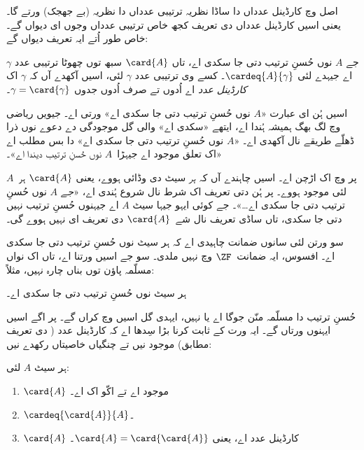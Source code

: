 \documentclass[../../../include/open-logic-section]{subfiles}
\begin{document}

اصل وچ کارڈینل عدداں دا ساڈا نظریہ ترتیبی عدداں دا نظریہ (بے جھجک) ورتے گا۔ یعنی اسیں کارڈینل عدداں دی تعریف کجھ خاص ترتیبی عدداں وجوں ای دیواں گے۔ خاص طور اُتے ایہ تعریف دیواں گے:

\begin{defn}
جے $A$ نوں حُسنِ ترتیب دتی جا سکدی اے، تاں $\card{A}$ سبھ توں چھوٹا ترتیبی عدد $\gamma$ اے جیہدے لئی $\cardeq{A}{\gamma}$۔ کسے وی ترتیبی عدد $\gamma$ لئی، اسیں آکھدے آں کہ $\gamma$ اک \emph{کارڈینل عدد} اے اُدوں تے صرف اُدوں جدوں $\gamma = \card{\gamma}$۔
\end{defn}

اسیں ہُن ای عبارت «$A$ نوں حُسنِ ترتیب دتی جا سکدی اے» ورتی اے۔ جیویں ریاضی وچ لگ بھگ ہمیشہ ہُندا اے، ایتھے «سکدی اے» والی گل موجودگی دے دعوے نوں ذرا ڈھلّے طریقے نال آکھدی اے۔ «$A$ نوں حُسنِ ترتیب دتی جا سکدی اے» دا بس مطلب اے «اک تعلق موجود اے جیہڑا~$A$ نوں حُسنِ ترتیب دیندا اے»۔

پر  وچ اک اڑچن اے۔ اسیں چاہندے آں کہ \emph{ہر} سیٹ دی وڈائی ہووے، یعنی $\card{A}$ ہر~$A$ لئی موجود ہووے۔ پر ہُن دتی تعریف اک شرط نال شروع ہُندی اے، «\emph{جے} $A$ نوں حُسنِ ترتیب دتی جا سکدی اے\ldots»۔ جے کوئی ایہو جیہا سیٹ $A$ اے جیہنوں حُسنِ ترتیب نہیں دتی جا سکدی، تاں ساڈی تعریف نال شے~$\card{A}$ دی تعریف ای نہیں ہووے گی۔

سو  ورتن لئی سانوں ضمانت چاہیدی اے کہ ہر سیٹ نوں حُسنِ ترتیب دتی جا سکدی اے۔ افسوس، ایہ ضمانت~$\ZF$ وچ نہیں ملدی۔ سو جے اسیں  ورتنا اے، تاں اک نواں مسلّمہ پاؤن توں بناں چارہ نہیں، مثلاً:
\begin{axiom}[حُسنِ ترتیب]
ہر سیٹ نوں حُسنِ ترتیب دتی جا سکدی اے۔
\end{axiom}
حُسنِ ترتیب دا مسلّمہ منّن جوگا اے یا نہیں، ایہدی گل اسیں  وچ کراں گے۔ پر اگے اسیں ایہنوں ورتاں گے۔ ایہ ورت کے ثابت کرنا بڑا سِدھا اے کہ کارڈینل عدد ( دی تعریف مطابق) موجود نیں تے چنگیاں خاصیتاں رکھدے نیں:

\begin{lem}
ہر سیٹ $A$ لئی:
\begin{enumerate}
	\item{} $\card{A}$ موجود اے تے اکّو اک اے۔
	\item{}  $\cardeq{\card{A}}{A}$۔
	\item{}  $\card{A}$ کارڈینل عدد اے، یعنی
	$\card{A} = \card{\card{A}}$۔
\end{enumerate}
\end{lem}
\end{document}
